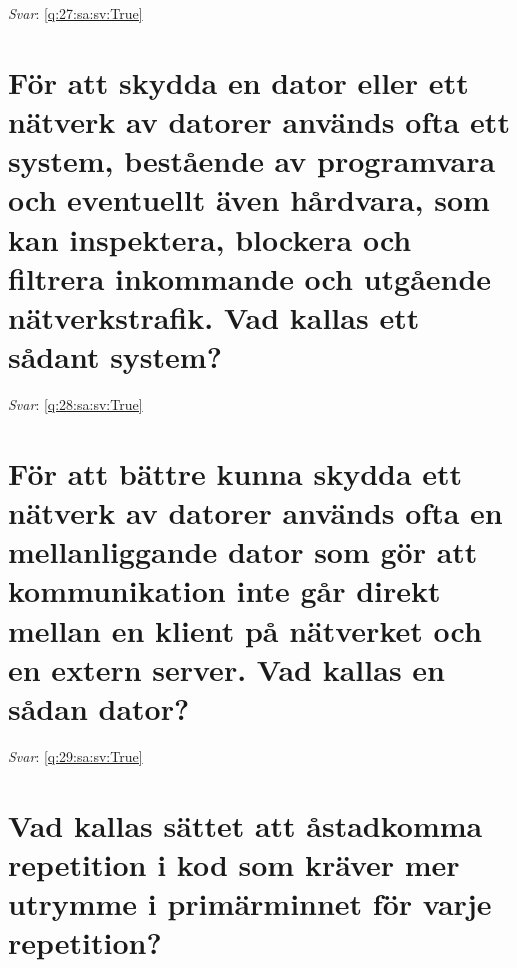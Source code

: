 \documentclass[a4paper,11pt,oneside]{book}
\begin{document}
\begin{sloppypar}
\textit{Svar}: \autoref{q:27:sa:sv:True}



\section{F\"or att skydda en dator eller ett n\"atverk av datorer anv\"ands ofta ett system, best\r{a}ende av programvara och eventuellt \"aven h\r{a}rdvara, som kan inspektera, blockera och filtrera inkommande och utg\r{a}ende n\"atverkstrafik. Vad kallas ett s\r{a}dant system?}

\label{q:28:sa:sv:False}

\vspace{2cm}

\noindent\makebox[\textwidth]{\hrulefill}

\vspace{1cm}

\textit{Svar}: \autoref{q:28:sa:sv:True}



\section{F\"or att b\"attre kunna skydda ett n\"atverk av datorer anv\"ands ofta en mellanliggande dator som g\"or att kommunikation inte g\r{a}r direkt mellan en klient p\r{a} n\"atverket och en extern server. Vad kallas en s\r{a}dan dator?}

\label{q:29:sa:sv:False}

\vspace{2cm}

\noindent\makebox[\textwidth]{\hrulefill}

\vspace{1cm}

\textit{Svar}: \autoref{q:29:sa:sv:True}



\section{Vad kallas s\"attet att \r{a}stadkomma repetition i kod som kr\"aver mer utrymme i prim\"arminnet f\"or varje repetition?}

\label{q:31:sa:sv:False}

\vspace{2cm}

\noindent\makebox[\textwidth]{\hrulefill}

\vspace{1cm}


\end{sloppypar}
\end{document}
